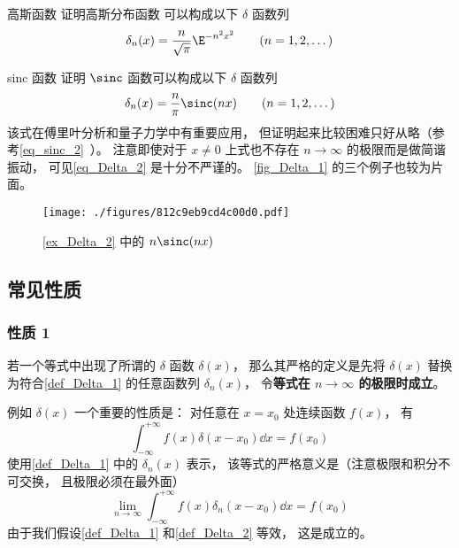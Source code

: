 \begin{exercise}{高斯函数}\label{exe_Delta_2}
证明高斯分布函数 可以构成以下 $\delta$ 函数列
\begin{equation}
\delta_n(x) = \frac{n}{\sqrt{\pi}} \E^{-{n ^2}x^2} \qquad (n = 1, 2, \dots)
\end{equation}
\end{exercise}

\begin{example}{sinc 函数}\label{ex_Delta_2}
证明 $\sinc$ 函数可以构成以下 $\delta$ 函数列
\begin{equation}\label{eq_Delta_10}
\delta_n(x) = \frac{n}{\pi}\sinc(n x) \qquad (n = 1, 2, \dots)
\end{equation}
该式在傅里叶分析和量子力学中有重要应用\cite{Arfken}， 但证明起来比较困难只好从略（参考\autoref{eq_sinc_2}~）。 注意即使对于 $x \ne 0$ 上式也不存在 $n\to\infty$ 的极限而是做简谐振动， 可见\autoref{eq_Delta_2} 是十分不严谨的。 \autoref{fig_Delta_1} 的三个例子也较为片面。
\end{example}
\begin{figure}[ht]
\centering
\texttt{[image: ./figures/812c9eb9cd4c00d0.pdf]}
\caption{\autoref{ex_Delta_2} 中的 $n\sinc(n x)$} \label{fig_Delta_2}
\end{figure}

\subsection{常见性质}
\subsubsection{性质 1}
若一个等式中出现了所谓的 $\delta$ 函数 $\delta(x)$， 那么其严格的定义是先将 $\delta(x)$ 替换为符合\autoref{def_Delta_1} 的任意函数列 $\delta_n(x)$， 令\textbf{等式在 $n\to\infty$ 的极限时成立}。

例如 $\delta(x)$ 一个重要的性质是： 对任意在 $x = x_0$ 处连续函数 $f(x)$， 有
\begin{equation}\label{eq_Delta_7}
\int_{-\infty}^{+\infty} f(x) \delta(x - x_0) \dd{x}= f(x_0)
\end{equation}
使用\autoref{def_Delta_1} 中的 $\delta_n(x)$ 表示， 该等式的严格意义是（注意极限和积分不可交换， 且极限必须在最外面）
\begin{equation}\label{eq_Delta_11}
\lim_{n\to\infty}\int_{-\infty}^{+\infty} f(x) \delta_n(x - x_0) \dd{x}= f(x_0)
\end{equation}
由于我们假设\autoref{def_Delta_1} 和\autoref{def_Delta_2} 等效， 这是成立的。

